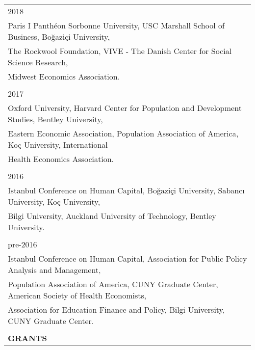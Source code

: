 \documentclass[12 pt]{article}
\begin{document}
\begin{longtable}{ccccc}
 \\ 
  \multicolumn{5}{l}{2018}\\
     \multicolumn{5}{l}{Paris I Panth\'{e}on Sorbonne University,  USC Marshall School of Business, Bo\u{g}azi\c{c}i University,} \\
   \multicolumn{5}{l}{The Rockwool Foundation, VIVE - The Danish Center for Social Science Research,} \\
      \multicolumn{5}{l}{Midwest Economics Association.} \\
\\
  \multicolumn{5}{l}{2017}\\

 \multicolumn{5}{l}{Oxford University, Harvard Center for Population and Development Studies, Bentley University,  }\\
  \multicolumn{5}{l}{Eastern Economic Association, Population Association of America,  Ko\c{c} University, International}\\
    \multicolumn{5}{l}{Health Economics Association.}\\
  
  \\

   
   \multicolumn{5}{l}{2016}\\

 \multicolumn{5}{l}{Istanbul Conference on Human Capital,  Bo\u{g}azi\c{c}i University, Sabanc{\i} University, Ko\c{c} University, }  \\
\multicolumn{5}{l}{ Bilgi University, Auckland University of Technology, Bentley University. }  \\
\\

   \multicolumn{5}{l}{pre-2016}\\

\multicolumn{5}{l}{Istanbul Conference on Human Capital, Association for Public Policy Analysis and Management,}  \\
\multicolumn{5}{l}{Population Association of America, CUNY Graduate Center, American Society of Health Economists,}      \\
\multicolumn{5}{l}{Association for Education Finance and Policy, Bilgi University, CUNY Graduate Center.}
 \\
 \\

 \multicolumn{5}{l}{\textbf{GRANTS}}\\[2 pt]


\end{longtable}
\end{document}
